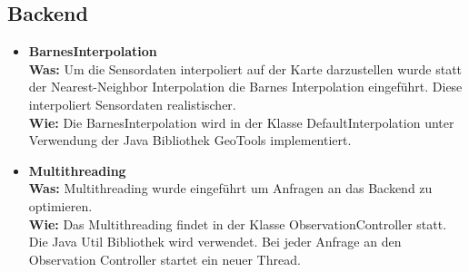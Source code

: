 \subsection{Backend}
\begin{itemize}
	\item \textbf{BarnesInterpolation}
	\\
	\textbf{Was:} Um die Sensordaten interpoliert auf der Karte darzustellen wurde statt der Nearest-Neighbor Interpolation die Barnes Interpolation eingeführt. Diese interpoliert Sensordaten realistischer.
	\\
	\textbf{Wie:} Die BarnesInterpolation wird in der Klasse DefaultInterpolation unter Verwendung der Java Bibliothek GeoTools implementiert. 
	\item \textbf{Multithreading}
	\\
	\textbf{Was:} Multithreading wurde eingeführt um Anfragen an das Backend zu optimieren.
	\\
	\textbf{Wie:} Das Multithreading findet in der Klasse ObservationController statt. Die Java Util Bibliothek wird verwendet. Bei jeder Anfrage an den Observation Controller startet ein neuer Thread.
\end{itemize}
